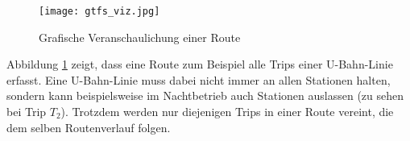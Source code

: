       \begin{figure}[htbp]
        \begin{center}
          \texttt{[image: gtfs\_viz.jpg]}
          \caption{Grafische Veranschaulichung einer Route}
          \label{fig:gtfs_viz}
        \end{center}
      \end{figure}

      Abbildung \ref{fig:gtfs_viz} zeigt, dass eine Route zum Beispiel alle Trips einer U-Bahn-Linie erfasst. Eine U-Bahn-Linie muss dabei nicht immer an allen Stationen halten, sondern kann beispielsweise im Nachtbetrieb auch Stationen auslassen (zu sehen bei Trip $T_2$). Trotzdem werden nur diejenigen Trips in einer Route vereint, die dem selben Routenverlauf folgen.

